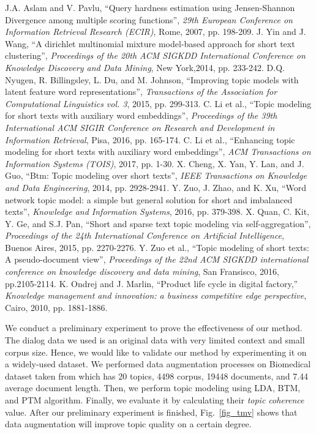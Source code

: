 \documentclass[conference]{IEEEtran}
\begin{document}
\begin{thebibliography}{00}
 J.A. Aslam and V. Pavlu, ``Query hardness estimation using Jensen-Shannon Divergence among multiple scoring functions'', {\it 29th European Conference on Information Retrieval Research (ECIR)}, Rome, 2007, pp. 198-209.
 J. Yin and J. Wang, ``A dirichlet multinomial mixture model-based approach for short text clustering'', {\it Proceedings of the 20th ACM SIGKDD International Conference on Knowledge Discovery and Data Mining}, New York,2014, pp. 233-242.
 D.Q. Nyugen, R. Billingsley, L. Du, and M. Johnson, ``Improving topic models with latent feature word representations'', {\it Transactions of the Association for Computational Linguistics vol. 3}, 2015, pp. 299-313.
 C. Li et al., ``Topic modeling for short texts with auxiliary word embeddings'', {\it Proceedings of the 39th International ACM SIGIR Conference on Research and Development in Information Retrieval}, Pisa, 2016, pp. 165-174.
 C. Li et al., ``Enhancing topic modeling for short texts with auxiliary word embeddings'', {\it ACM Transactions on Information Systems (TOIS)}, 2017, pp. 1-30.
 X. Cheng, X. Yan, Y. Lan, and J. Guo, ``Btm: Topic modeling over short texts'', {\it IEEE Transactions on Knowledge and Data Engineering}, 2014, pp. 2928-2941.
 Y. Zuo, J. Zhao, and K. Xu, ``Word network topic model: a simple but general solution for short and imbalanced texts'', {\it Knowledge and Information Systems}, 2016, pp.  379-398.
 X. Quan, C. Kit, Y. Ge, and S.J. Pan, ``Short and sparse text topic modeling via self-aggregation'', {\it Proceedings of the 24th International Conference on Artificial Intelligence}, Buenos Aires, 2015, pp. 2270-2276.
 Y. Zuo et al., ``Topic modeling of short texts: A pseudo-document view'', {\it Proceedings of the 22nd ACM SIGKDD international conference on knowledge discovery and data mining}, San Fransisco, 2016, pp.2105-2114.
 K. Ondrej and J. Marlin, ``Product life cycle in digital factory,'' {\it Knowledge management and innovation: a business competitive edge perspective}, Cairo, 2010, pp. 1881-1886.  
\end{thebibliography}

\label{appendix_1}
\noindent We conduct a preliminary experiment to prove the effectiveness of our method. The dialog data we used is an original data with very limited context and small corpus size. Hence, we would like to validate our method by experimenting it on a widely-used dataset. We performed data augmentation processes on Biomedical dataset taken from\cite{b6} which has 20 topics, 4498 corpus, 19448 documents, and 7.44 average document length. Then, we perform topic modeling using LDA, BTM, and PTM algorithm. Finally, we evaluate it by calculating their {\it topic coherence} value. After our preliminary experiment is finished, Fig.~\ref{fig_tmv} shows that data augmentation will improve topic quality on a certain degree.
\end{document}
